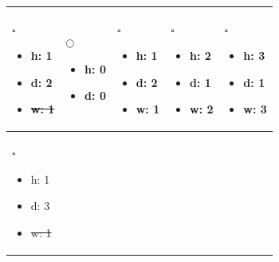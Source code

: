 \begin{table}[h]
\begin{tabular}{|p{3cm}|p{3cm}|p{3cm}|p{3cm}|p{3cm}|}
\\ \hline

 $ \square $
\begin{itemize} 
    \vspace*{-1\baselineskip} 
    \item h: 1
    \item d: 2
    \item  \sout{w: 1}
\end{itemize} 

& 

$ \bigcirc $
\begin{itemize} 
    \vspace*{-1\baselineskip} 
    \item h: 0
    \item d: 0
\end{itemize} 

&

 $ \square $
\begin{itemize} 
    \vspace*{-1\baselineskip} 
    \item h: 1
    \item d: 2
    \item w: 1
\end{itemize} 

& 

 $ \square $
\begin{itemize} 
    \vspace*{-1\baselineskip} 
    \item h: 2
    \item d: 1
    \item w: 2
\end{itemize} 

& 

 $ \square $
\begin{itemize} 
    \vspace*{-1\baselineskip} 
   \item h: 3
    \item d: 1
    \item w: 3
    
\end{itemize} 

\\ \hline




 $ \square $
\begin{itemize} 
    \vspace*{-1\baselineskip} 
    \item h: 1
    \item d: 3
    \item  \sout{w: 1}


\end{itemize}
\end{tabular}
\end{table}
